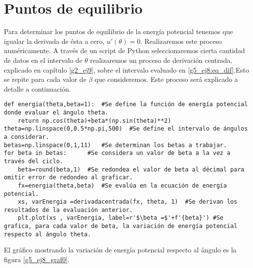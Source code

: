 \documentclass[../portafolio.tex]{subfiles}
\begin{document}
\section{Puntos de equilibrio}
Para determinar los puntos de equilibrio de la energía potencial tenemos que igualar la derivada de ésta a cero, $u'(\theta)=0$. Realizaremos este proceso numéricamente. A través de un script de Python seleccionaremos cierta cantidad de datos en el intervalo de $\theta$ realizaremos un proceso de derivación centrada, explicado en capítulo \ref{g2_ej9}, sobre el intervalo evaluado en \eqref{g5_ej8:eq_dif}.Esto se repite para cada valor de $\beta$ que consideremos. Este proceso será explicado a detalle a continuación.
\begin{verbatim}
def energia(theta,beta=1):	#Se define la función de energía potencial donde evaluar el ángulo theta.
    return np.cos(theta)+beta*(np.sin(theta)**2)
theta=np.linspace(0,0.5*np.pi,500)	#Se define el intervalo de ángulos a considerar.
betas=np.linspace(0,1,11)	#Se determinan los betas a trabajar.
for beta in betas:		#Se considera un valor de beta a la vez a través del ciclo.
    beta=round(beta,1)	#Se redondea el valor de beta al décimal para omitir error de redondeo al graficar.
    fx=energia(theta,beta)	#Se evalúa en la ecuación de energía potencial.
    xs, varEnergia =derivadacentrada(fx, theta, 1)	#Se derivan los resultados de la evaluación anterior.
    plt.plot(xs , varEnergia, label=r'$\beta =$'+f'{beta}')	#Se grafica, para cada valor de beta, la variación de energía potencial respecto al ángulo theta.
\end{verbatim}
El gráfico mostrando la variación de energía potencial respecto al ángulo es la figura \ref{g5_ej8_graf0}.
\end{document}
